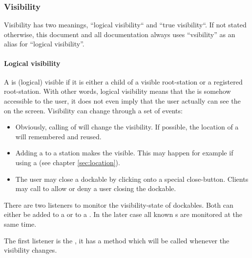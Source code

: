 
\subsubsection{Visibility}
Visibility has two meanings, ``logical visibility`` and ``true visibility``. If not stated otherwise, this document and all documentation always uses ``vsibility'' as an alias for ``logical visibility''.

\paragraph{Logical visibility}
A  is (logical) visible if it is either a child of a visible root-station or a registered root-station. With other words, logical visibility means that the  is somehow accessible to the user, it does not even imply that the user actually can see the  on the screen. Visibility can change through a set of events:
\begin{itemize}
 \item Obviously, calling  of  will change the visibility. If possible, the location of a  will remembered and reused.
 \item Adding a  to a station makes the  visible. This may happen for example if using a  (see chapter \ref{sec:location}).
 \item The user may close a dockable by clicking onto a special close-button. Clients may call  to allow or deny a user closing the dockable.
\end{itemize}

There are two listeners to monitor the visibility-state of dockables. Both can either be added to a  or to a . In the later case all known s are monitored at the same time.

The first listener is the , it has a method \linebreak {} which will be called whenever the visibility changes.

